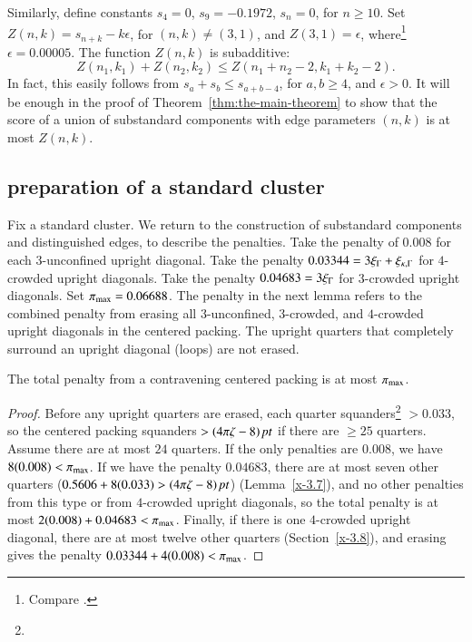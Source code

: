 Similarly, define constants $s_4=0$, $s_9 = -0.1972$, $s_{n}=0$, for
$n\ge10$.  Set $Z(n,k) = s_{n+k}-k\epsilon$, for $(n,k)\ne (3,1)$, and
$Z(3,1)=\epsilon$, where\footnote{Compare .} %
 $\epsilon=0.00005$. The function
$Z(n,k)$ is subadditive:
    $$Z(n_1,k_1)+Z(n_2,k_2) \le Z(n_1+n_2-2,k_1+k_2-2).$$
In fact, this easily follows from $s_a+s_b\le s_{a+b-4}$, for $a,b\ge
4$, and $\epsilon>0$. It will be enough in the proof of
Theorem~\ref{thm:the-main-theorem} to show that the score of a union of
substandard components with edge parameters $(n,k)$ is at most $Z(n,k)$.


\subsection{preparation of a standard cluster} %
   \label{sec:prep-cluster}

Fix a standard cluster.  We return to the construction of
substandard components and distinguished edges, to describe the penalties.
Take the penalty of $0.008$ for each $3$-unconfined upright
diagonal. Take the penalty $0.03344 = 3\xi_\Gamma+\xi_{\kappa,\Gamma}$ for $4$-crowded
upright diagonals. Take the penalty $0.04683=3\xi_\Gamma$ for
$3$-crowded upright diagonals. Set $\pi_{\max}=0.06688$. The penalty
in the next lemma refers to the combined penalty from erasing all
$3$-unconfined, $3$-crowded, and $4$-crowded upright diagonals in
the centered packing. The upright quarters that completely
surround an upright diagonal (loops) are not erased.

\begin{lemma}
The total penalty from a contravening centered packing is at most
$\pi_{\max}$.
\end{lemma}

\begin{proof}
Before any upright quarters are erased, each quarter
squanders\footnote{} %
$>0.033$, so the centered packing squanders $>(4\pi\zeta-8)\,\hbox{\it pt}$ if there
are $\ge25$ quarters.  Assume there are at most $24$ quarters. If
the only penalties are $0.008$, we have $8(0.008)<\pi_{\max}$. If we
have the penalty $0.04683$, there are at most seven other quarters
($0.5606+8(0.033)>(4\pi\zeta-8)\,\hbox{\it pt}$) (Lemma~\ref{x-3.7}), and no other
penalties from this type or from $4$-crowded upright diagonals, so
the total penalty is at most $2(0.008)+ 0.04683 < \pi_{\max}$.
Finally, if there is one $4$-crowded upright diagonal, there are
at most twelve other quarters (Section~\ref{x-3.8}), and erasing
gives the penalty $0.03344+4 (0.008)<\pi_{\max}$.
\end{proof}

